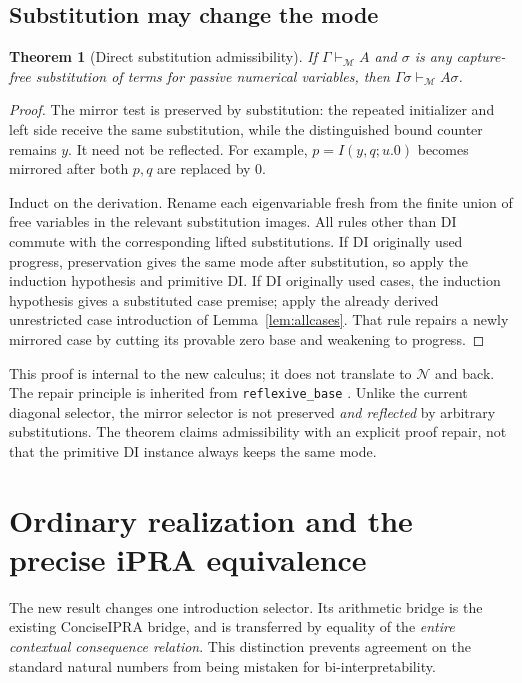 \documentclass[11pt]{article}
\newtheorem{theorem}{Theorem}[section]
\theoremstyle{definition}\newtheorem{definition}[theorem]{Definition}
\newcommand{\Mcal}{\mathcal M}
\newcommand{\Ncal}{\mathcal N}
\begin{document}
\subsection{Substitution may change the mode}
\begin{theorem}[Direct substitution admissibility]\label{thm:subst}
If $\Gamma\vdash_{\Mcal}A$ and $\sigma$ is any capture-free substitution
of terms for passive numerical variables, then
$\Gamma\sigma\vdash_{\Mcal}A\sigma$.
\end{theorem}
\begin{proof}
The mirror test is preserved by substitution: the repeated initializer
and left side receive the same substitution, while the distinguished
bound counter remains $y$. It need not be reflected. For example,
$p=I(y,q;u.0)$ becomes mirrored after both $p,q$ are replaced by $0$.

Induct on the derivation. Rename each eigenvariable fresh from the finite
union of free variables in the relevant substitution images. All rules
other than DI commute with the corresponding lifted substitutions. If
DI originally used progress, preservation gives the same mode after
substitution, so apply the induction hypothesis and primitive DI. If
DI originally used cases, the induction hypothesis gives a substituted
case premise; apply the already derived unrestricted case introduction
of Lemma~\ref{lem:allcases}. That rule repairs a newly mirrored case by
cutting its provable zero base and weakening to progress.
\end{proof}

This proof is internal to the new calculus; it does not translate to
$\Ncal$ and back. The repair principle is inherited from
\texttt{reflexive\_base} \cite{reflexive}. Unlike the current diagonal
selector, the mirror selector is not preserved \emph{and reflected} by
arbitrary substitutions. The theorem claims admissibility with an
explicit proof repair, not that the primitive DI instance always keeps
the same mode.

\section{Ordinary realization and the precise iPRA equivalence}

The new result changes one introduction selector.  Its arithmetic bridge is
the existing ConciseIPRA bridge, and is transferred by equality of the
\emph{entire contextual consequence relation}.  This distinction prevents
agreement on the standard natural numbers from being mistaken for
bi-interpretability.
\end{document}
